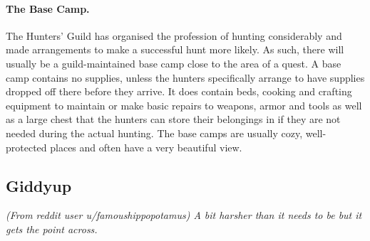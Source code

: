 \paragraph{The Base Camp.} The Hunters' Guild has organised the profession of hunting considerably and made arrangements to make a successful hunt more likely. As such, there will usually be a guild-maintained base camp close to the area of a quest. A base camp contains no supplies, unless the hunters specifically arrange to have supplies dropped off there before they arrive. It does contain beds, cooking and crafting equipment to maintain or make basic repairs to weapons, armor and tools as well as a large chest that the hunters can store their belongings in if they are not needed during the actual hunting. The base camps are usually cozy, well-protected places and often have a very beautiful view.


\subsection{Giddyup}
\textit{(From reddit user u/famoushippopotamus) A bit harsher than it needs to be but it gets the point across.}

